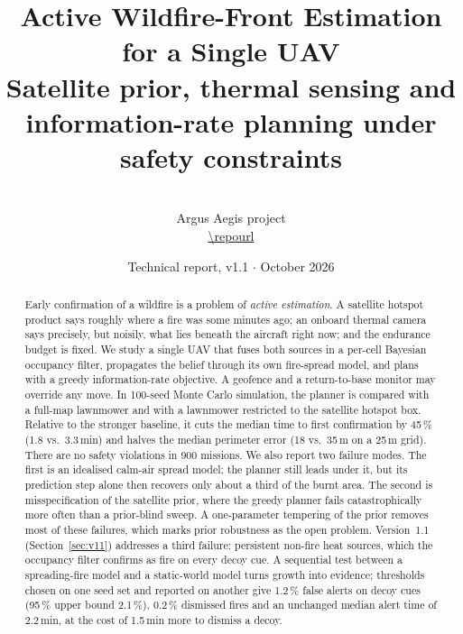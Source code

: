 \documentclass[10pt,a4paper]{article}
\title{\textbf{Active Wildfire-Front Estimation for a Single UAV}\\[0.3em]
\large Satellite prior, thermal sensing and information-rate planning under safety constraints}
\author{\authorname\\ \small Argus Aegis project\\ \small \url{\repourl}}
\date{Technical report, v1.1 $\cdot$ October 2026}
\begin{document}
\maketitle

\begin{abstract}
\noindent
Early confirmation of a wildfire is a problem of \emph{active estimation}. A satellite hotspot product says roughly where a fire was some minutes ago; an onboard thermal camera says precisely, but noisily, what lies beneath the aircraft right now; and the endurance budget is fixed. We study a single UAV that fuses both sources in a per-cell Bayesian occupancy filter, propagates the belief through its own fire-spread model, and plans with a greedy information-rate objective. A geofence and a return-to-base monitor may override any move. In 100-seed Monte Carlo simulation, the planner is compared with a full-map lawnmower and with a lawnmower restricted to the satellite hotspot box. Relative to the stronger baseline, it cuts the median time to first confirmation by 45\,\% (1.8 vs.\ 3.3\,min) and halves the median perimeter error (18 vs.\ 35\,m on a 25\,m grid). There are no safety violations in 900 missions. We also report two failure modes. The first is an idealised calm-air spread model; the planner still leads under it, but its prediction step alone then recovers only about a third of the burnt area. The second is misspecification of the satellite prior, where the greedy planner fails catastrophically more often than a prior-blind sweep. A one-parameter tempering of the prior removes most of these failures, which marks prior robustness as the open problem. Version~1.1 (Section~\ref{sec:v11}) addresses a third failure: persistent non-fire heat sources, which the occupancy filter confirms as fire on every decoy cue. A sequential test between a spreading-fire model and a static-world model turns growth into evidence; thresholds chosen on one seed set and reported on another give 1.2\,\% false alerts on decoy cues (95\,\% upper bound 2.1\,\%), 0.2\,\% dismissed fires and an unchanged median alert time of 2.2\,min, at the cost of 1.5\,min more to dismiss a decoy.
\end{abstract}
\end{document}
